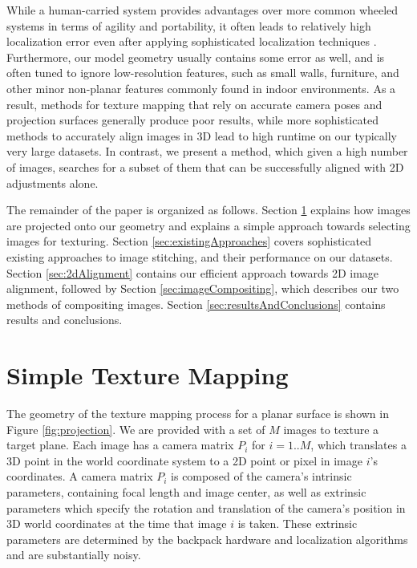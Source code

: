 \documentclass[]{spie}  %
\begin{document}
While a human-carried system provides advantages over more common
wheeled systems in terms of agility and portability, it often leads to
relatively high localization error even after applying sophisticated
localization techniques \cite{liu2010indoor}. Furthermore, our model
geometry usually contains some error as well, and is often tuned to
ignore low-resolution features, such as small walls, furniture, and
other minor non-planar features commonly found in indoor
environments. As a result, methods for texture mapping that rely on
accurate camera poses and projection surfaces generally produce poor
results, while more sophisticated methods to accurately align images
in 3D lead to high runtime on our typically very large datasets. In
contrast, we present a method, which given a high number of images,
searches for a subset of them that can be successfully aligned with 2D
adjustments alone.

The remainder of the paper is organized as follows. Section
\ref{sec:simpleTextureMapping} explains how images are projected onto
our geometry and explains a simple approach towards selecting images
for texturing. Section \ref{sec:existingApproaches} covers
sophisticated existing approaches to image stitching, and their
performance on our datasets. Section \ref{sec:2dAlignment} contains
our efficient approach towards 2D image alignment, followed by Section
\ref{sec:imageCompositing}, which describes our two methods of
compositing images. Section \ref{sec:resultsAndConclusions} contains
results and conclusions.





\section{Simple Texture Mapping}
\label{sec:simpleTextureMapping}

The geometry of the texture mapping process for a planar surface is
shown in Figure \ref{fig:projection}.  We are provided with a set of
$M$ images to texture a target plane. Each image has a camera matrix
$P_i$ for $i=1..M$, which translates a 3D point in the world
coordinate system to a 2D point or pixel in image $i$'s coordinates. A
camera matrix $P_i$ is composed of the camera's intrinsic parameters,
containing focal length and image center, as well as extrinsic
parameters which specify the rotation and translation of the camera's
position in 3D world coordinates at the time that image $i$ is
taken. These extrinsic parameters are determined by the backpack
hardware and localization algorithms \cite{chen2010indoor,
  liu2010indoor, kua2012loopclosure} and are substantially noisy.
\end{document}
